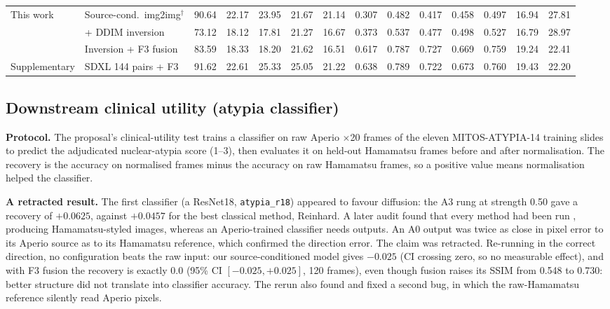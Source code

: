 \begin{table}[!tbp]
\begin{tabular}{llrrrrrrrrrrrr}
\midrule
This work & Source-cond.\ img2img$^\dagger$ & 90.64 & 22.17 & 23.95 & 21.67 & 21.14 & 0.307 & 0.482 & 0.417 & 0.458 & 0.497 & 16.94 & 27.81\\
 & + DDIM inversion & 73.12 & 18.12 & 17.81 & 21.27 & 16.67 & 0.373 & 0.537 & 0.477 & 0.498 & 0.527 & 16.79 & 28.97\\
 & Inversion + F3 fusion & 83.59 & 18.33 & 18.20 & 21.62 & 16.51 & 0.617 & 0.787 & 0.727 & 0.669 & 0.759 & 19.24 & 22.41\\
\midrule
Supplementary & SDXL 144 pairs + F3 & 91.62 & 22.61 & 25.33 & 25.05 & 21.22 & 0.638 & 0.789 & 0.722 & 0.673 & 0.760 & 19.43 & 22.20\\
\bottomrule
\end{tabular}
\end{table}

\subsection{Downstream clinical utility (atypia classifier)}
\label{app:clinical}

\textbf{Protocol.} The proposal's clinical-utility test trains a classifier on raw Aperio $\times$20 frames
of the eleven MITOS-ATYPIA-14 training slides to predict the adjudicated nuclear-atypia score (1--3), then
evaluates it on held-out Hamamatsu frames before and after normalisation. The recovery is the accuracy on
normalised frames minus the accuracy on raw Hamamatsu frames, so a positive value means normalisation
helped the classifier.

\textbf{A retracted result.} The first classifier (a ResNet18, \texttt{atypia\_r18}) appeared to favour
diffusion: the A3 rung at strength 0.50 gave a recovery of $+0.0625$, against $+0.0457$ for the best
classical method, Reinhard. A later audit found that every method had been run \AtoH{}, producing
Hamamatsu-styled images, whereas an Aperio-trained classifier needs \HtoA{} outputs. An A0 output was twice
as close in pixel error to its Aperio source as to its Hamamatsu reference, which confirmed the direction
error. The claim was retracted. Re-running in the correct direction, no configuration beats the raw input:
our source-conditioned \HtoA{} model gives $-0.025$ (CI crossing zero, so no measurable effect), and with F3 fusion the recovery is
exactly $0.0$ (95\% CI $[-0.025,+0.025]$, 120 frames), even though fusion raises its SSIM from 0.548 to
0.730: better structure did not translate into classifier accuracy. The rerun also found and fixed a second bug, in which the raw-Hamamatsu reference silently read
Aperio pixels.

